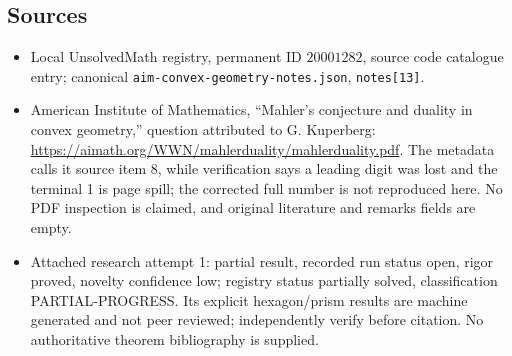 \documentclass[11pt]{article}
\begin{document}
\subsection{Sources}
\begin{itemize}
\item Local UnsolvedMath registry, permanent ID $20001282$, source code catalogue entry; canonical \texttt{aim-convex-geometry-notes.json}, \texttt{notes[13]}.
\item American Institute of Mathematics, ``Mahler's conjecture and duality in convex geometry,'' question attributed to G. Kuperberg: \url{https://aimath.org/WWN/mahlerduality/mahlerduality.pdf}. The metadata calls it source item 8, while verification says a leading digit was lost and the terminal 1 is page spill; the corrected full number is not reproduced here. No PDF inspection is claimed, and original literature and remarks fields are empty.
\item Attached research attempt 1: partial result, recorded run status open, rigor proved, novelty confidence low; registry status partially solved, classification PARTIAL-PROGRESS. Its explicit hexagon/prism results are machine generated and not peer reviewed; independently verify before citation. No authoritative theorem bibliography is supplied.
\end{itemize}
\end{document}
